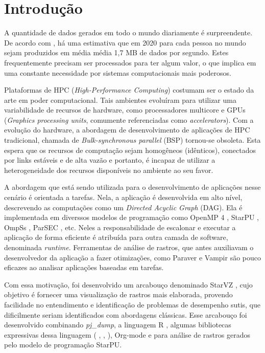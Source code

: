 \chapter{Introdução} \label{ch:intro}

A quantidade de dados gerados em todo o mundo diariamente é surpreendente. De 
acordo com \citet{ref:data_minute2}, há uma estimativa que em 2020 para cada pessoa 
no mundo sejam produzidos em média média 1,7 MB de dados por segundo. Estes frequentemente precisam 
ser processados para ter algum valor, o que implica em uma constante necessidade 
por sistemas computacionais mais poderosos.

Plataformas de HPC (\textit{High-Performance Computing}) costumam ser o estado 
da arte em poder computacional. Tais ambientes evoluíram para utilizar 
uma variabilidade de recursos de hardware, como processadores multicore e GPUs 
(\textit{Graphics processing units}, comumente referenciadas como 
\textit{accelerators}). Com a evolução do hardware, a abordagem de 
desenvolvimento de aplicações de HPC tradicional, chamada de 
\textit{Bulk-synchronous parallel} (BSP) tornou-se obsoleta. Esta espera que os 
recursos de computação sejam homogêneos (idênticos), conectados por 
links estáveis e de alta vazão e portanto, é incapaz de utilizar a 
heterogeneidade dos recursos disponíveis no ambiente ao seu favor. 

A abordagem que está sendo utilizada para o desenvolvimento de aplicações nesse 
cenário é orientada a tarefas. Nela, a aplicação é desenvolvida em alto nível, 
descrevendo as computações como um \textit{Directed Acyclic Graph} (DAG). Ela é 
implementada em diverssos modelos de programação como OpenMP 4 
\cite{ref:openmp4}, StarPU \cite{ref:starpu}, OmpSs \cite{ref:ompss}, 
ParSEC \cite{ref:parsec}, etc. Neles a responsabilidade de 
escalonar e executar a aplicação de forma eficiente é atribuída para outra 
camada de software, denominada \textit{runtime}. Ferramentas de análise de 
rastros, que antes auxiliavam o desenvolvedor da aplicação a fazer 
otimizações, como Paraver \cite{ref:paraver} e Vampir \cite{ref:vampir} são 
pouco eficazes ao analisar aplicações baseadas em tarefas.

Com essa motivação, foi desenvolvido um arcabouço denominado StarVZ 
\cite{ref:starvz}, cujo objetivo é fornecer uma visualização de rastros mais 
elaborada, provendo facilidade no entendimento e identificação de problemas de 
desempenho sutis, que dificilmente seriam identificados com abordagens 
clássicas. Esse arcabouço foi desenvolvido combinando \textit{pj\_dump},  
a linguagem R \cite{ref:rlanguage}, algumas bibliotecas expressivas dessa 
linguagem ( \cite{ref:ggplot2},  
\cite{ref:lpsolve},  \cite{ref:tidyverse}), Org-mode 
\cite{ref:org-mode} e  para análise de rastros gerados pelo 
modelo de programação StarPU.

